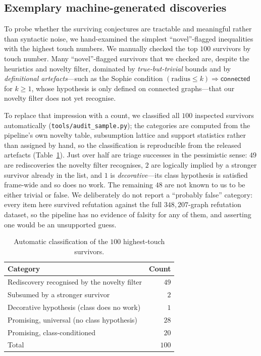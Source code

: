 \documentclass[]{ceurart}
\begin{document}
\subsection{Exemplary machine-generated discoveries}
\label{sec:worked}

To probe whether the surviving conjectures are tractable and meaningful rather than syntactic noise, we
hand-examined the simplest ``novel''-flagged inequalities with the highest touch numbers. We manually checked the top $100$ survivors by touch number. Many ``novel''-flagged survivors that we checked are, despite the heuristics and novelty filter, dominated by
\emph{true-but-trivial} bounds and by \emph{definitional artefacts}---such as the Sophie condition
$(\mathrm{radius}\le k)\Rightarrow\textsf{connected}$ for $k\ge 1$, whose hypothesis is
only defined on connected graphs---that our novelty filter does not yet recognise.

To replace that impression with a count, we classified all $100$ inspected survivors
automatically (\texttt{tools/audit\_sample.py}); the categories are computed from the
pipeline's own novelty table, subsumption lattice and support statistics rather than
assigned by hand, so the classification is reproducible from the released artefacts
(Table~\ref{tab:audit}). Just over half are triage successes in the pessimistic sense:
$49$ are rediscoveries the novelty filter recognises, $2$ are logically implied by a
stronger survivor already in the list, and $1$ is \emph{decorative}---its class
hypothesis is satisfied frame-wide and so does no work. The remaining $48$ are not
known to us to be either trivial or false. We deliberately do not report a
``probably false'' category: every item here survived refutation against the full
$348{,}207$-graph refutation dataset, so the pipeline has no evidence of falsity for any of them,
and asserting one would be an unsupported guess.

\begin{table}[!h]
  \caption{Automatic classification of the $100$ highest-touch survivors.}
  \label{tab:audit}
  \begin{tabular}{lr}
    \toprule
    Category & Count \\
    \midrule
    Rediscovery recognised by the novelty filter & $49$ \\
    Subsumed by a stronger survivor & $2$ \\
    Decorative hypothesis (class does no work) & $1$ \\
    Promising, universal (no class hypothesis) & $28$ \\
    Promising, class-conditioned & $20$ \\
    \midrule
    Total & $100$ \\
    \bottomrule
  \end{tabular}
\end{table}
\end{document}
